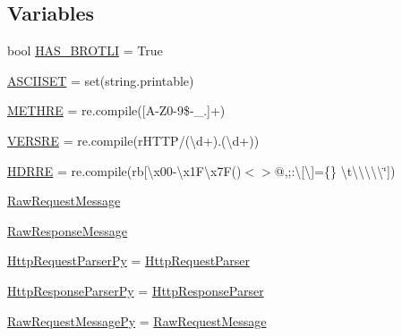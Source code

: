 \subsection*{Variables}
\begin{DoxyCompactItemize}
\item 
bool \hyperlink{namespaceaiohttp_1_1http__parser_a682a305227344337395db6b0cbb71c2e}{H\+A\+S\+\_\+\+B\+R\+O\+T\+LI} = True
\item 
\hyperlink{namespaceaiohttp_1_1http__parser_ad34d8c557c54ddce20f2faa48d2e0de1}{A\+S\+C\+I\+I\+S\+ET} = set(string.\+printable)
\item 
\hyperlink{namespaceaiohttp_1_1http__parser_a67e285145b881194db143b0d42e8a7ef}{M\+E\+T\+H\+RE} = re.\+compile(\textquotesingle{}\mbox{[}A-\/Z0-\/9\$-\/\+\_\+.\mbox{]}+\textquotesingle{})
\item 
\hyperlink{namespaceaiohttp_1_1http__parser_a3d426008497c6379763a5e54d57c4e10}{V\+E\+R\+S\+RE} = re.\+compile(r\textquotesingle{}H\+T\+TP/(\textbackslash{}d+).(\textbackslash{}d+)\textquotesingle{})
\item 
\hyperlink{namespaceaiohttp_1_1http__parser_a0e2442276587c8f1e2096fd57bd9df8e}{H\+D\+R\+RE} = re.\+compile(rb\textquotesingle{}\mbox{[}\textbackslash{}x00-\/\textbackslash{}x1\+F\textbackslash{}x7F()$<$$>$@,;\+:\textbackslash{}\mbox{[}\textbackslash{}\mbox{]}=\{\} \textbackslash{}t\textbackslash{}\textbackslash{}\textbackslash{}\textbackslash{}\textbackslash{}\char`\"{}\mbox{]}\textquotesingle{})
\item 
\hyperlink{namespaceaiohttp_1_1http__parser_a4145f5fa947ac335040e980b0dca95b4}{Raw\+Request\+Message}
\item 
\hyperlink{namespaceaiohttp_1_1http__parser_a9963bd217f7dd3de0c17e121b8b0d4fa}{Raw\+Response\+Message}
\item 
\hyperlink{namespaceaiohttp_1_1http__parser_ab2d73f2ef1bcf7615fc933016ba7c63b}{Http\+Request\+Parser\+Py} = \hyperlink{classaiohttp_1_1http__parser_1_1_http_request_parser}{Http\+Request\+Parser}
\item 
\hyperlink{namespaceaiohttp_1_1http__parser_a2b89ea624cadc6361f7183067560a909}{Http\+Response\+Parser\+Py} = \hyperlink{classaiohttp_1_1http__parser_1_1_http_response_parser}{Http\+Response\+Parser}
\item 
\hyperlink{namespaceaiohttp_1_1http__parser_aceeb7becd192bc314ffb5275726a611d}{Raw\+Request\+Message\+Py} = \hyperlink{namespaceaiohttp_1_1http__parser_a4145f5fa947ac335040e980b0dca95b4}{Raw\+Request\+Message}
\item 
$$
\end{DoxyCompactItemize}
